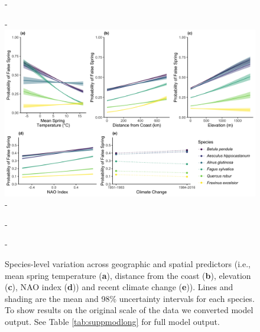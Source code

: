 \documentclass{article}\usepackage[]{graphicx}\usepackage[]{color}
\begin{document}
  
{\begin{figure} [H]
  -\begin{center}
  -\includegraphics[width=16cm]{..//..//analyses/figures/Species_long.png}
  -\caption{Species-level variation across geographic and spatial predictors (i.e., mean spring temperature (\textbf{a}), distance from the coast (\textbf{b}), elevation (\textbf{c}), NAO index (\textbf{d})) and recent climate change (\textbf{e})). Lines and shading are the mean and 98\% uncertainty intervals for each species. To show results on the original scale of the data we converted model output. See Table \ref{tab:suppmodlong} for full model output. }\label{fig:spp}
  -\end{center}
  -\end{figure}}


  
\end{document}
